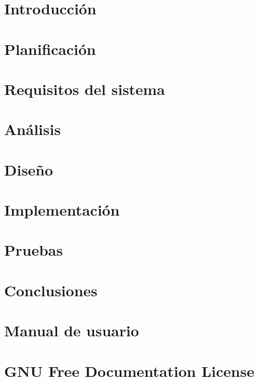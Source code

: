 \documentclass[a4paper, 12pt]{book}
\begin{document}


\tableofcontents
\listoffigures
\listoftables

\chapter{Introducción}
\label{chap:introduccion}


\chapter{Planificación}
\label{chap:calendario}


\chapter{Requisitos del sistema}
\label{chap:requisitos}


\chapter{Análisis}
\label{chap:analisis}


\chapter{Diseño}
\label{chap:diseno}


\chapter{Implementación}
\label{chap:implementacion}


\chapter{Pruebas}
\label{chap:pruebas}


\chapter{Conclusiones}
\label{chap:conclusiones}


\appendix

\chapter{Manual de usuario}
\label{chap:manual_usuario}


\chapter{GNU Free Documentation License}
\label{sec:fdl}




\end{document}
